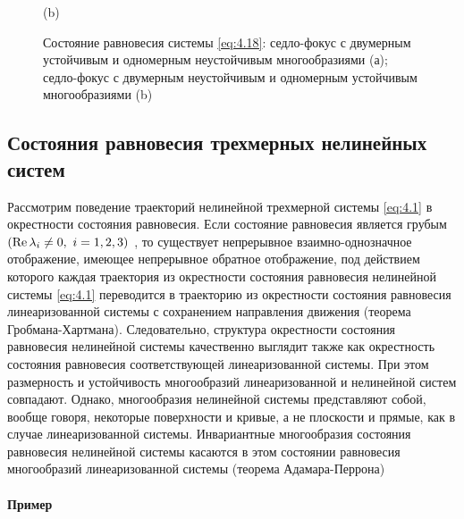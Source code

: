 \begin{figure}[h!]
\begin{minipage}{0.45\linewidth}
                (b)      
        \end{minipage}
        \caption{Состояние равновесия системы \eqref{eq:4.18}: седло-фокус с двумерным устойчивым и одномерным неустойчивым многообразиями (а); седло-фокус с двумерным неустойчивым и одномерным устойчивым многообразиями (b)}
        \label{fig:4.5}
\end{figure}


\subsection{Состояния равновесия трехмерных нелинейных систем}%
\label{sub:sostoianie_ravnovesiia_trekhmernykh_nelineinykh_sistem}

Рассмотрим поведение траекторий нелинейной трехмерной системы \eqref{eq:4.1} в
окрестности состояния равновесия. Если состояние равновесия является
грубым 
$\qty(\Re \lambda_i \neq 0,~ i=1,2,3)$ , то существует непрерывное взаимно-однозначное
отображение, имеющее непрерывное обратное отображение, под действием
которого каждая траектория из окрестности состояния равновесия нелинейной
системы \eqref{eq:4.1} переводится в траекторию из окрестности состояния равновесия
линеаризованной системы с сохранением направления движения (теорема
Гробмана-Хартмана). Следовательно, структура окрестности состояния
равновесия нелинейной системы качественно выглядит также как окрестность
состояния равновесия соответствующей линеаризованной системы. При этом
размерность и устойчивость многообразий линеаризованной и нелинейной
систем совпадают. Однако, многообразия нелинейной системы представляют
собой, вообще говоря, некоторые поверхности и кривые, а не плоскости и
прямые, как в случае линеаризованной системы. Инвариантные многообразия
состояния равновесия нелинейной системы касаются в этом состоянии
равновесия многообразий линеаризованной системы (теорема Адамара-Перрона)
\paragraph{Пример}%
\label{par:primer}

